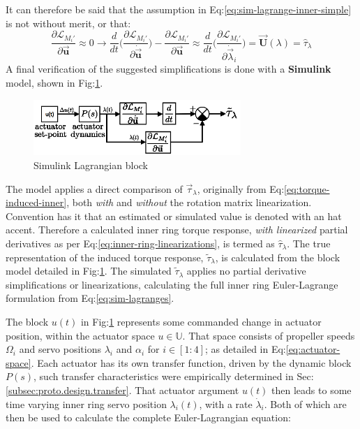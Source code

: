 It can therefore be said that the assumption in Eq:\ref{eq:sim-lagrange-inner-simple} is not without merit, or that:
\begin{equation}
\frac{\partial\mathcal{L}_{M_i'}}{\partial\vec{\mathbf{u}}}\approx 0\rightarrow\frac{d}{dt}\bigg(\frac{\partial\mathcal{L}_{M_i'}}{\partial\dot{\vec{\mathbf{u}}}}\bigg)-\frac{\partial\mathcal{L}_{M_i'}}{\partial\vec{\mathbf{u}}}\approx\frac{d}{dt}\Big(\frac{\partial\mathcal{L}_{M_i'}}{\partial\dot{\vec{\lambda}}_i}\Big)=\vec{\mathbf{U}}(\lambda)=\hat{\tau}_\lambda
\end{equation}
A final verification of the suggested simplifications is done with a \textbf{Simulink} model, shown in Fig:\ref{fig:linear-block}.
\par
\begin{figure}[htbp]
\vspace{-4pt}
\centering
\includegraphics[width=0.7\textwidth]{figs/linear-block}
\caption{Simulink Lagrangian block}
\label{fig:linear-block}
\vspace{-15pt}
\end{figure}
\par
 The model applies a direct comparison of $\vec{\tau}_\lambda$, originally from Eq:\ref{eq:torque-induced-inner}, both \emph{with} and \emph{without} the rotation matrix linearization. Convention has it that an estimated or simulated value is denoted with an hat accent. Therefore a calculated inner ring torque response, \emph{with linearized} partial derivatives as per Eq:\ref{eq:inner-ring-linearizations}, is termed as $\hat{\tau}_\lambda$. The true representation of the induced torque response, $\widetilde{\tau}_\lambda$, is calculated from the block model detailed in Fig:\ref{fig:linear-block}. The simulated $\widetilde{\tau}_\lambda$ applies no partial derivative simplifications or linearizations, calculating the full inner ring Euler-Lagrange formulation from Eq:\ref{eq:sim-lagranges}.
\par
The block $u(t)$ in Fig:\ref{fig:linear-block} represents some commanded change in actuator position, within the actuator space $u\in\mathbb{U}$. That space consists of propeller speeds $\Omega_i$ and servo positions $\lambda_i$ and $\alpha_i$ for $i\in[1:4]$; as detailed in Eq:\ref{eq:actuator-space}. Each actuator has its own transfer function, driven by the dynamic block $P(s)$, such transfer characteristics were empirically determined in Sec:\ref{subsec:proto.design.transfer}. That actuator argument $u(t)$ then leads to some time varying inner ring servo position $\lambda_i(t)$, with a rate $\dot{\lambda}_i$. Both of which are then be used to calculate the complete Euler-Lagrangian equation:
